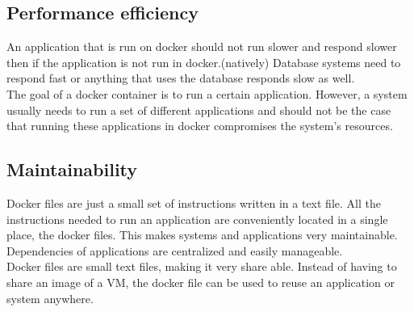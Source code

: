 \subsection*{Performance efficiency}
An application that is run on docker should not run slower and respond slower then if the application is not run in docker.\ign(natively) Database systems need to respond fast or anything that uses the database responds slow as well.\\
The goal of a docker container is to run a certain application. However, a system usually needs to run a set of different applications and should not be the case that running these applications in docker compromises the system's resources.\\

\subsection*{Maintainability}
Docker files are just a small set of instructions written in a text file. All the instructions needed to run an application are conveniently located in a single place, the docker files. This makes systems and applications very maintainable.\\
Dependencies of applications are centralized and easily manageable.\\
Docker files are small text files, making it very share able. Instead of having to share an image of a VM, the docker file can be used to reuse an application or system anywhere.\\